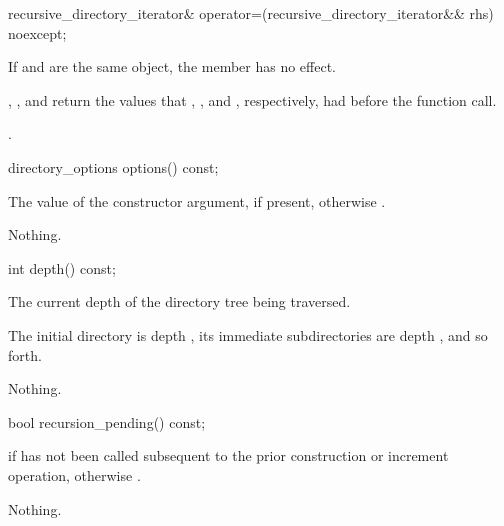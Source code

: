 %
\begin{itemdecl}
recursive_directory_iterator& operator=(recursive_directory_iterator&& rhs) noexcept;
\end{itemdecl}

\begin{itemdescr}
\pnum
\effects If  and  are the same
object, the member has no effect.

\pnum
\postconditions {}, ,
and  return the values that ,
, and , respectively, had before the function call.

\pnum
\returns {}.
\end{itemdescr}

%
\begin{itemdecl}
directory_options options() const;
\end{itemdecl}

\begin{itemdescr}
\pnum
\returns The value of the constructor  argument,
if present, otherwise .

\pnum
\throws Nothing.
\end{itemdescr}

%
\begin{itemdecl}
int depth() const;
\end{itemdecl}

\begin{itemdescr}
\pnum
\returns The current depth of the directory tree being traversed. \begin{note}
  The initial directory is depth , its immediate subdirectories are depth ,
  and so forth. \end{note}

\pnum
\throws Nothing.
\end{itemdescr}

%
\begin{itemdecl}
bool recursion_pending() const;
\end{itemdecl}

\begin{itemdescr}
\pnum
\returns {} if 
  has not been called subsequent to the prior construction or increment
  operation, otherwise .

\pnum
\throws Nothing.
\end{itemdescr}


